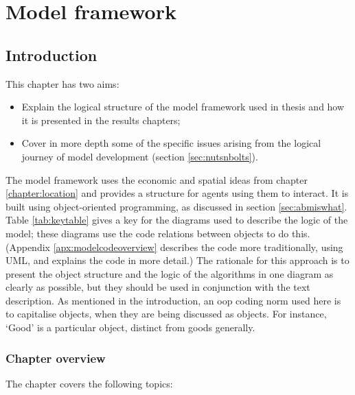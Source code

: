 \chapter{Model framework \label{chapter:modelfw}}

\section{Introduction \label{sec:frameworkintro}}


This chapter has two aims:

\begin{itemize}
	\item Explain the logical structure of the model framework used in thesis and how it is presented in the results chapters;
	\item Cover in more depth some of the specific issues arising from the logical journey of model development (section \ref{sec:nutsnbolts}).
\end{itemize}

The model framework uses the economic and spatial ideas from chapter \ref{chapter:location} and provides a structure for agents using them to interact. It is built using object-oriented programming, as discussed in section \ref{sec:abmiswhat}. Table \ref{tab:keytable} gives a key for the diagrams used to describe the logic of the model; these diagrams use the code relations between objects to do this. (Appendix \ref{apx:modelcodeoverview} describes the code more traditionally, using UML, and explains the code in more detail.) The rationale for this approach is to present the object structure and the logic of the algorithms in one diagram as clearly as possible, but they should be used in conjunction with the text description. As mentioned in the introduction, an \gls{oop} coding norm used here is to capitalise objects, when they are being discussed as objects. For instance, `Good' is a particular object, distinct from goods generally. 



\subsection{Chapter overview}

The chapter covers the following topics:

